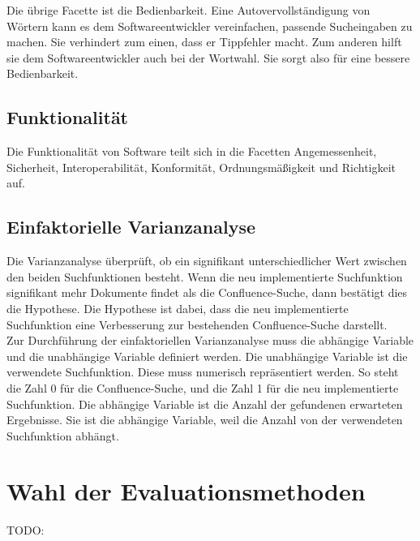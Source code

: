Die übrige Facette ist die Bedienbarkeit.
Eine Autovervollständigung von Wörtern kann es dem Softwareentwickler vereinfachen, passende Sucheingaben zu machen.
Sie verhindert zum einen, dass er Tippfehler macht.
Zum anderen hilft sie dem Softwareentwickler auch bei der Wortwahl.
Sie sorgt also für eine bessere Bedienbarkeit.\\

\subsection{Funktionalität}
Die Funktionalität von Software teilt sich in die Facetten Angemessenheit, Sicherheit, Interoperabilität, Konformität, Ordnungsmäßigkeit und Richtigkeit auf.


\subsection{Einfaktorielle Varianzanalyse}
Die Varianzanalyse überprüft, ob ein signifikant unterschiedlicher Wert zwischen den beiden Suchfunktionen besteht.
Wenn die neu implementierte Suchfunktion signifikant mehr Dokumente findet als die Confluence-Suche, dann bestätigt dies die Hypothese.
Die Hypothese ist dabei, dass die neu implementierte Suchfunktion eine Verbesserung zur bestehenden Confluence-Suche darstellt.\\

Zur Durchführung der einfaktoriellen Varianzanalyse muss die abhängige Variable und die unabhängige Variable definiert werden.
Die unabhängige Variable ist die verwendete Suchfunktion.
Diese muss numerisch repräsentiert werden.
So steht die Zahl 0 für die Confluence-Suche, und die Zahl 1 für die neu implementierte Suchfunktion.
Die abhängige Variable ist die Anzahl der gefundenen erwarteten Ergebnisse.
Sie ist die abhängige Variable, weil die Anzahl von der verwendeten Suchfunktion abhängt.


\section{Wahl der Evaluationsmethoden}
TODO: